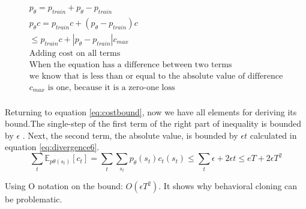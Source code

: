 \documentclass[]{article}
\begin{document}
\begin{equation*}
\begin{aligned}
    p_{\theta} = p_{train} + p_{\theta} - p_{train} \\ 
    p_{\theta}c = p_{train}c + (p_{\theta} - p_{train})c \\ 
    \leq  p_{train}c + |p_{\theta} - p_{train}|c_{max} \\ 
    \text{Adding cost on all terms} \\ 
    \text{When the equation has a difference between two terms} \\
    \text{we know that is less than or equal to the absolute value of difference} \\
    \text{$c_{max} $ is one, because it is a zero-one loss} \\
\end{aligned}
\end{equation*}

\par Returning to equation \eqref{eq:costbound}, now we have all elements for deriving its bound.The single-step of the
first term of the right part of inequality is bounded by $\epsilon$ . Next, the second term, the absolute value, is bounded
by $\epsilon t$ calculated in equation \eqref{eq:divergence6}. 
\begin{equation}
    \sum_{t}\mathbb{E}_{p\theta(s_{t})}[c_{t}] = \sum_{t} \sum_{s_{t}} p_{\theta}(s_{t})c_{t}(s_{t}) \leq \sum_{t}\epsilon +
    2\epsilon t \leq eT + 2\epsilon T^{2}
\end{equation}

\par Using O notation on the bound: $O(\epsilon T^{2})$. It shows why behavioral cloning can be problematic. 
\end{document}
